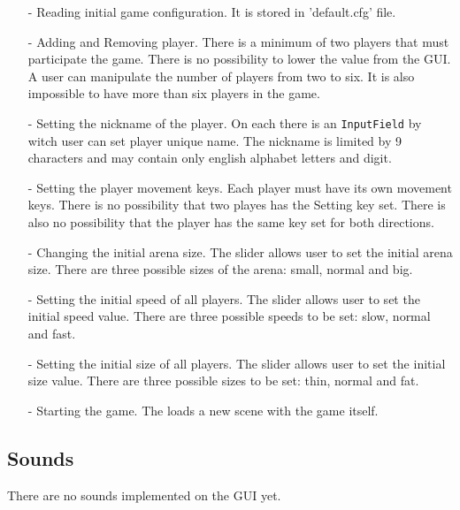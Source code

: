 \begin{itemize}
	\item[-] Reading initial game configuration. It is stored in 'default.cfg' file.
	\item[-] Adding and Removing player. There is a minimum of two players that must participate the game. There is no possibility  to lower the value from the GUI. A user can manipulate the number of players from two to six. It is also impossible to have more than six players in the game.
	\item[-] Setting the nickname of the player. On each  there is an \verb+InputField+ by witch user can set player unique name. The nickname is limited by 9 characters and may contain only english alphabet letters and digit.
	\item[-] Setting the player movement keys. Each player must have its own movement keys. There is no possibility that two playes has the Setting key set. There is also no possibility that the player has the same key set for both directions.
	\item[-] Changing the initial arena size. The  slider allows user to set the initial arena size. There are three possible sizes of the arena: small, normal and big.
	\item[-] Setting the initial speed of all players. The  slider allows user to set the initial speed value. There are three possible speeds to be set: slow, normal and fast.
	\item[-] Setting the initial size of all players. The  slider allows user to set the initial size value. There are three possible sizes to be set: thin, normal and fat.
	\item[-] Starting the game. The  loads a new scene with the game itself.
\end{itemize} 

\subsection{Sounds}
\indent There are no sounds implemented on the GUI yet.